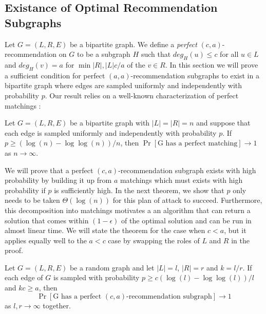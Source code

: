\subsection{Existance of Optimal Recommendation Subgraphs}
Let $G=(L,R,E)$ be a bipartite graph. We define a \emph{perfect} $(c,a)$-recommendation on $G$ to be a subgraph $H$ such that $deg_H(u)\leq c$ for all $u\in L$ and $deg_H(v)=a$ for $\min{|R|,|L|c/a}$ of the $v\in R$. In this section we will prove a sufficient condition for perfect $(a,a)$-recommendation subgraphs to exist in a bipartite graph where edges are sampled uniformly and independently with probability $p$. Our result relies on a well-known characterization of perfect matchings \cite{Janson2011}:

\label{random_matching_threshold}
\begin{thm}
Let $G=(L,R,E)$ be a bipartite graph with $|L| = |R| = n$ and suppose that each edge is sampled uniformly and independently with probability $p$. If $p \geq (\log(n) - \log\log(n))/n$, then $\Pr[\text{G has a perfect matching}] \to 1$ as $n\to\infty$.
\end{thm}

We will prove that a perfect $(c,a)$-recommendation subgraph exists with high probability by building it up from $a$ matchings which must exists with high probability if $p$ is sufficiently high. In the next theorem, we show that $p$ only needs to be taken $\Theta(\log(n))$ for this plan of attack to succeed. Furthermore, this decomposition into matchings motivates a an algorithm that can return a solution that comes within $(1-\epsilon)$ of the optimal solution and can be run in almost linear time. We will state the theorem for the case when $c<a$, but it applies equally well to the $a<c$ case by swapping the roles of $L$ and $R$ in the proof.

\begin{thm}
Let $G=(L,R,E)$ be a random graph and let $|L|=l$, $|R|=r$ and $k=l/r$. If each edge of $G$ is sampled with probability $p\geq c(\log(l)-\log\log(l))/l$ and $kc \geq a$, then 
\[ \Pr[\text{G has a perfect $(c,a)$-recommendation subgraph}] \to 1\]
as $l,r\to\infty$ together.
\end{thm}


